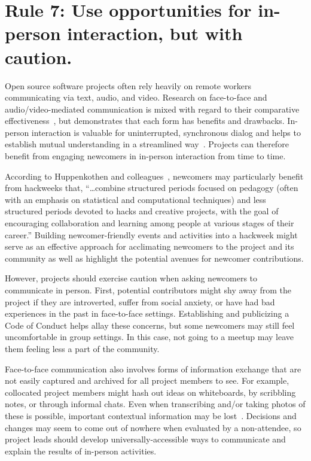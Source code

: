 \documentclass[10pt,letterpaper]{article}
\newcommand{\rulemajor}[1]{\section*{#1}}
\begin{document}
\rulemajor{Rule 7: Use opportunities for in-person interaction, but with caution.}

Open source software projects often rely heavily on remote workers communicating via text, audio, and video.
Research on face-to-face and audio/video-mediated communication is mixed
with regard to their comparative effectiveness~\cite{doherty1997,gallupe1990,nardi2002},
but demonstrates that each form has benefits and drawbacks.
In-person interaction is valuable for uninterrupted, synchronous dialog
and helps to establish mutual understanding in a streamlined way~\cite{omalley1996}.
Projects can therefore benefit from engaging newcomers in in-person interaction from time to time.

According to Huppenkothen and colleagues~\cite{huppenkothen2018},
newcomers may particularly benefit from hackweeks that,
``{\ldots}combine structured periods focused on pedagogy
(often with an emphasis on statistical and computational techniques)
and less structured periods devoted to hacks and creative projects,
with the goal of encouraging collaboration and learning among people at various stages of their career.''
Building newcomer-friendly events and activities into a hackweek
might serve as an effective approach for acclimating newcomers to the project and its community
as well as highlight the potential avenues for newcomer contributions.

However,
projects should exercise caution when asking newcomers to communicate in person.
First, potential contributors might shy away from the project if they are introverted,
suffer from social anxiety,
or have had bad experiences in the past in face-to-face settings.
Establishing and publicizing a Code of Conduct helps allay these concerns,
but some newcomers may still feel uncomfortable in group settings.
In this case,
not going to a meetup may leave them feeling less a part of the community.

Face-to-face communication also involves forms of information exchange
that are not easily captured and archived for all project members to see.
For example,
collocated project members might hash out ideas on whiteboards,
by scribbling notes,
or through informal chats.
Even when transcribing and/or taking photos of these is possible,
important contextual information may be lost~\cite{cherubini2007}.
Decisions and changes may seem to come out of nowhere when evaluated by a non-attendee,
so project leads should develop universally-accessible ways to communicate and explain the results of in-person activities.
\end{document}
